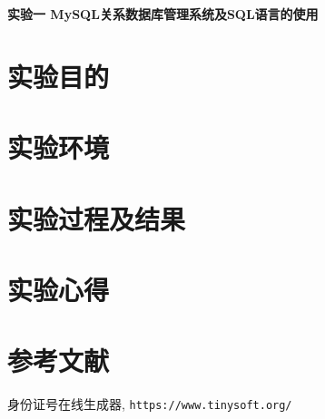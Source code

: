 \documentclass{ML}
\begin{document}
\maketitle

\tableofcontents
\newpage

\begin{center}
    \textbf{ 实验一 MySQL关系数据库管理系统及SQL语言的使用}
\end{center}

\section{实验目的}

\section{实验环境}

\section{实验过程及结果}

\section{实验心得}


\section{参考文献}
\begin{thebibliography}{20}
     身份证号在线生成器, \texttt{https://www.tinysoft.org/}
\end{thebibliography}
\end{document}

